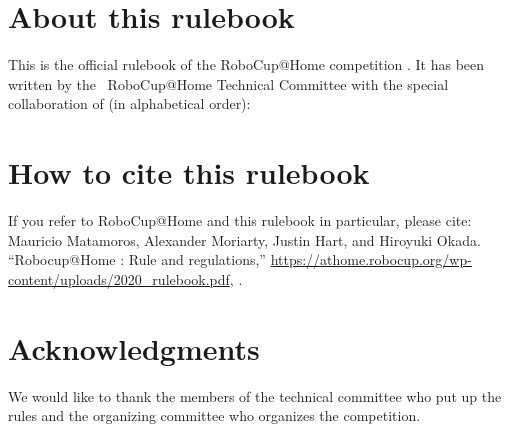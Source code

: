


\section*{About this rulebook}
This is the official rulebook of the RoboCup@Home competition \YEAR.
It has been written by the \YEAR ~RoboCup@Home Technical Committee with the special collaboration of (in alphabetical order):



\section*{How to cite this rulebook}
If you refer to RoboCup@Home and this rulebook in particular, please cite:
Mauricio Matamoros, Alexander Moriarty, Justin Hart, and Hiroyuki Okada.
\enquote{Robocup@Home \YEAR: Rule and regulations,}
\url{https://athome.robocup.org/wp-content/uploads/2020_rulebook.pdf}, \YEAR.

\begin{center}
\begin{minipage}{0.8\textwidth}
	\scriptsize%
	
\end{minipage}
\end{center}

\section*{Acknowledgments}
\label{sec:acknowledgments}
We would like to thank the members of the technical committee who put up the rules and the organizing committee who organizes the competition.

